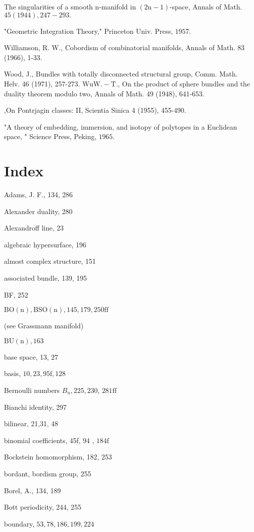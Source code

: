 \documentclass[10pt]{article}
\begin{document}
The singularities of a smooth $\mathrm{n}$-manifold in $(2 \mathrm{n}-1)$-space, Annals of Math. $45(1944), 247-293 .$

"Geometric Integration Theory," Princeton Univ. Press, $1957 .$

Williamson, R. W., Cobordism of combinatorial manifolds, Annals of Math. 83 (1966), 1-33.

Wood, J., Bundles with totally disconnected structural group, Comm. Math. Helv. 46 (1971), 257-273. $\mathrm{Wu} \mathrm{W} .-\mathrm{T} .$, On the product of sphere bundles and the duality theorem modulo two, Annals of Math. 49 (1948), 641-653.

,On Pontrjagin classes: II, Scientia Sinica 4 (1955), 455-490.

"A theory of embedding, immersion, and isotopy of polytopes in a Euclidean space, " Science Press, Peking, $1965 .$

\section{Index}
Adams, J. F., 134, 286

Alexander duality, 280

Alexandroff line, 23

algebraic hypersurface, 196

almost complex structure, 151

associated bundle, 139, 195

BF, 252

$\mathrm{BO}(\mathrm{n}), \mathrm{BSO}(\mathrm{n}), 145,179,250 \mathrm{ff}$

(see Grassmann manifold)

$\mathrm{BU}(\mathrm{n}), 163$

base space, 13, 27

basis, $10,23,95 \mathrm{f}, 128$

Bernoulli numbers $B_{n}, 225,230$, $281 \mathrm{ff}$

Bianchi identity, 297

bilinear, 21,31, 48

binomial coefficients, 45f, 94 , $184 \mathrm{f}$

Bockstein homomorphism, 182, 253

bordant, bordism group, 255

Borel, A., 134, 189

Bott periodicity, 244, 255

boundary, $53,78,186,199,224$
\end{document}
